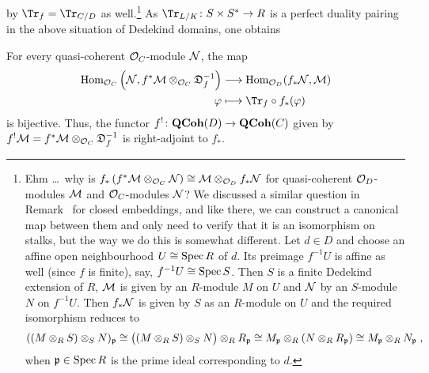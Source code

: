 \documentclass[a4paper,parskip=half,numbers=enddot, DIV=12]{scrreprt}
\begin{document}
by $\Tr_f=\Tr_{C/D}$ as well.\footnote{Ehm \ldots\ why is $f_*\left(f^*\mathcal{M}\otimes_{\mathcal{O}_C}\mathcal{N}\right)\cong \mathcal{M}\otimes_{\mathcal{O}_D}f_*\mathcal{N}$ for quasi-coherent $\mathcal{O}_D$-modules $\mathcal{M}$ and $\mathcal{O}_C$-modules $\mathcal{N}$? We discussed a similar question in Remark~ for closed embeddings, and like there, we can construct a canonical map between them and only need to verify that it is an isomorphism on stalks, but the way we do this is somewhat different. Let $d\in D$ and choose an affine open neighbourhood $U\cong \operatorname{Spec} R$ of $d$. Its preimage $f^{-1}U$ is affine as well (since $f$ is finite), say, $f^{-1}U\cong \operatorname{Spec} S$. Then $S$ is a finite Dedekind extension of $R$, $\mathcal{M}$ is given by an $R$-module $M$ on $U$ and $\mathcal{N}$ by an $S$-module $N$ on $f^{-1}U$. Then $f_*\mathcal{N}$ is given by $S$ as an $R$-module on $U$ and the required isomorphism reduces to
\begin{align*}
	((M\otimes_RS)\otimes_SN)_{\mathfrak{p}}\cong \big((M\otimes_RS)\otimes_SN\big)\otimes_RR_{\mathfrak{p}}\cong M_{\mathfrak{p}}\otimes_R(N\otimes_RR_{\mathfrak{p}})\cong M_{\mathfrak{p}}\otimes_RN_{\mathfrak{p}}\;,
\end{align*}
when $\mathfrak{p}\in\operatorname{Spec} R$ is the prime ideal corresponding to $d$.} As $\Tr_{L/K}\colon S\times S^*\morphism R$ is a perfect duality pairing in the above situation of Dedekind domains, one obtains
\begin{prop}
	For every quasi-coherent $\mathcal{O}_C$-module $\mathcal{N}$, the map
	\begin{align}\lbl{eq:f^!adjunction}
		\begin{split}
			\Hom_{\Oo_C}\left(\Nn,f^*\Mm\otimes_{\Oo_C}\DD_f^{-1}\right)&\morphism\Hom_{\Oo_D}(f_*\Nn,\Mm)\\
			\phi&\longmapsto\Tr_f\circ f_*(\phi)
		\end{split}
	\end{align}
	is bijective. Thus, the functor $f^!\colon\cat{QCoh}(D)\morphism\cat{QCoh}(C)$ given by $f^!\mathcal{M}=f^*\mathcal{M}\otimes_{\mathcal{O}_C}\mathfrak{D}_f^{-1}$ is right-adjoint to $f_*$.
\end{prop}
\end{document}
